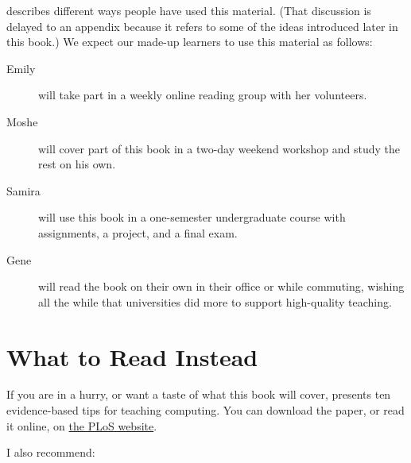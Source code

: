  describes different ways people have used
this material.  (That discussion is delayed to an appendix because it
refers to some of the ideas introduced later in this book.)  We expect
our made-up learners to use this material as follows:

\begin{description}

  \item[Emily] will take part in a weekly online reading group with
    her volunteers.

  \item[Moshe] will cover part of this book in a two-day weekend
    workshop and study the rest on his own.

  \item[Samira] will use this book in a one-semester undergraduate
    course with assignments, a project, and a final exam.

  \item[Gene] will read the book on their own in their office or
    while commuting, wishing all the while that universities did more
    to support high-quality teaching.

\end{description}

\section{What to Read Instead}\label{s:intro-instead}

If you are in a hurry, or want a taste of what this book will cover,
\cite{Brow2018} presents ten evidence-based tips for teaching
computing.  You can download the paper, or read it online, on
\href{https://doi.org/10.1371/journal.pcbi.1006023}{the PLoS website}.

I also recommend:

